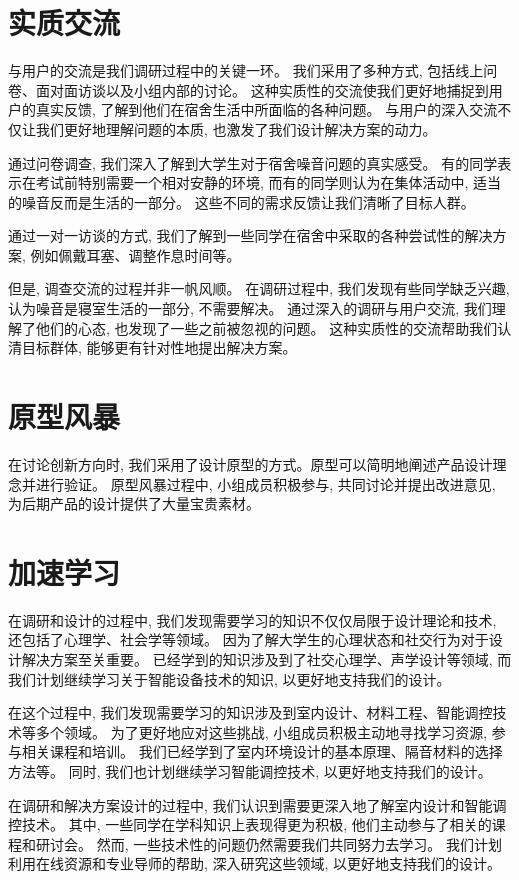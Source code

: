 \documentclass[a4paper]{article}
\begin{document}
    \section{实质交流}

    {
        与用户的交流是我们调研过程中的关键一环。
        我们采用了多种方式, 包括线上问卷、面对面访谈以及小组内部的讨论。
        这种实质性的交流使我们更好地捕捉到用户的真实反馈, 
        了解到他们在宿舍生活中所面临的各种问题。
        与用户的深入交流不仅让我们更好地理解问题的本质, 
        也激发了我们设计解决方案的动力。

        通过问卷调查, 我们深入了解到大学生对于宿舍噪音问题的真实感受。
        有的同学表示在考试前特别需要一个相对安静的环境, 
        而有的同学则认为在集体活动中, 适当的噪音反而是生活的一部分。
        这些不同的需求反馈让我们清晰了目标人群。

        通过一对一访谈的方式, 我们了解到一些同学在宿舍中采取的各种尝试性的解决方案, 
        例如佩戴耳塞、调整作息时间等。

        但是, 调查交流的过程并非一帆风顺。
        在调研过程中, 我们发现有些同学缺乏兴趣, 认为噪音是寝室生活的一部分, 不需要解决。
        通过深入的调研与用户交流, 我们理解了他们的心态, 也发现了一些之前被忽视的问题。
        这种实质性的交流帮助我们认清目标群体, 能够更有针对性地提出解决方案。  
    }

    \section{原型风暴}

    {
        在讨论创新方向时, 我们采用了设计原型的方式。原型可以简明地阐述产品设计理念并进行验证。
        原型风暴过程中, 小组成员积极参与, 共同讨论并提出改进意见, 
        为后期产品的设计提供了大量宝贵素材。
    }

    \section{加速学习}

    {
        在调研和设计的过程中, 我们发现需要学习的知识不仅仅局限于设计理论和技术, 
        还包括了心理学、社会学等领域。
        因为了解大学生的心理状态和社交行为对于设计解决方案至关重要。
        已经学到的知识涉及到了社交心理学、声学设计等领域, 
        而我们计划继续学习关于智能设备技术的知识, 以更好地支持我们的设计。

        在这个过程中, 我们发现需要学习的知识涉及到室内设计、材料工程、智能调控技术等多个领域。
        为了更好地应对这些挑战, 小组成员积极主动地寻找学习资源, 参与相关课程和培训。
        我们已经学到了室内环境设计的基本原理、隔音材料的选择方法等。
        同时, 我们也计划继续学习智能调控技术, 以更好地支持我们的设计。

        在调研和解决方案设计的过程中, 我们认识到需要更深入地了解室内设计和智能调控技术。
        其中, 一些同学在学科知识上表现得更为积极, 他们主动参与了相关的课程和研讨会。
        然而, 一些技术性的问题仍然需要我们共同努力去学习。
        我们计划利用在线资源和专业导师的帮助, 深入研究这些领域, 以更好地支持我们的设计。
    }
\end{document}
